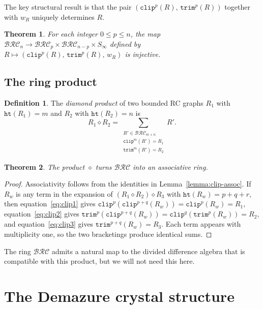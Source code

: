 \documentclass{amsart}
\newtheorem{theorem}{Theorem}[section]
\theoremstyle{definition}
\newtheorem{definition}[lemma]{Definition}
\theoremstyle{remark}
\numberwithin{equation}{section}
\newcommand{\BRC}{\mathcal{BRC}}
\newcommand{\wof}[1]{w_{#1}}
\newcommand{\hr}{\mathtt{ht}}
\newcommand{\trm}{\mathtt{trim}}
\begin{document}
The key structural result is that the pair $(\mathtt{clip}^p(R),\, \trm^p(R))$ together with $\wof{R}$ uniquely determines $R$.

\begin{theorem}\label{theorem:injectivity}
For each integer $0 \leq p \leq n$, the map $\BRC_n \to \BRC_p \times \BRC_{n-p} \times S_\infty$ defined by $R \mapsto (\mathtt{clip}^p(R),\, \trm^p(R),\, \wof{R})$ is injective.
\end{theorem}

\subsection{The ring product}

\begin{definition}\label{definition:diamond}
The \textit{diamond product} of two bounded RC graphs $R_1$ with $\hr(R_1) = m$ and $R_2$ with $\hr(R_2) = n$ is
\[
R_1 \diamond R_2 = \sum_{\substack{R' \in \BRC_{m+n} \\ \mathtt{clip}^m(R') = R_1 \\ \trm^m(R') = R_2}} R'.
\]
\end{definition}

\begin{theorem}\label{theorem:ring}
The product $\diamond$ turns $\BRC$ into an associative ring.
\end{theorem}

\begin{proof}
Associativity follows from the identities in Lemma~\ref{lemma:clip-assoc}.  If $R_w$ is any term in the expansion of $(R_1 \diamond R_2) \diamond R_3$ with $\hr(R_w) = p + q + r$, then equation~\eqref{eq:clip1} gives $\mathtt{clip}^p(\mathtt{clip}^{p+q}(R_w)) = \mathtt{clip}^p(R_w) = R_1$, equation~\eqref{eq:clip2} gives $\trm^p(\mathtt{clip}^{p+q}(R_w)) = \mathtt{clip}^q(\trm^p(R_w)) = R_2$, and equation~\eqref{eq:clip3} gives $\trm^{p+q}(R_w) = R_3$.  Each term appears with multiplicity one, so the two bracketings produce identical sums.
\end{proof}

The ring $\BRC$ admits a natural map to the divided difference algebra that is compatible with this product, but we will not need this here.




\section{The Demazure crystal structure}\label{section:crystals}
\end{document}
